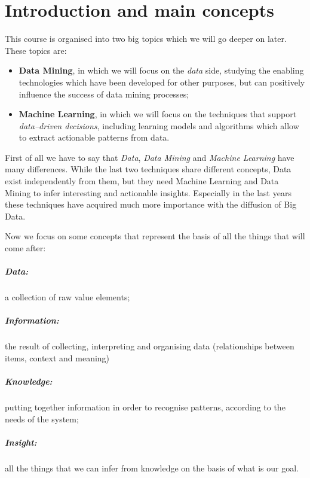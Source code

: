 \chapter{Introduction and main concepts}
\setcounter{page}{1}

This course is organised into two big topics which we will go deeper on later. These topics are:
\begin{itemize}
    \item \textbf{Data Mining}, in which we will focus on the \textit{data} side, studying the enabling technologies which have been developed for other purposes, but can positively influence the success of data mining processes;
    \item \textbf{Machine Learning}, in which we will focus on the techniques that support \textit{data–driven decisions}, including learning models and algorithms which allow to extract actionable patterns from data.
\end{itemize}

First of all we have to say that \textit{Data}, \textit{Data Mining} and \textit{Machine Learning} have many differences. While the last two techniques share different concepts, Data exist independently from them, but they need Machine Learning and Data Mining to infer interesting and actionable insights. Especially in the last years these techniques have acquired much more importance with the diffusion of Big Data.

Now we focus on some concepts that represent the basis of all the things that will come after:
\paragraph{Data:} a collection of raw value elements;
\paragraph{Information:} the result of collecting, interpreting and organising data (relationships between items, context and meaning)
\paragraph{Knowledge:} putting together information in order to recognise patterns, according to the needs of the system;
\paragraph{Insight:} all the things that we can infer from knowledge on the basis of what is our goal.

